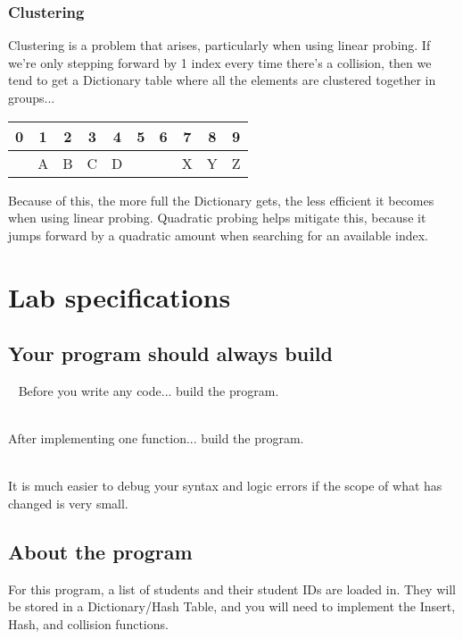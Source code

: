 \documentclass[a4paper,12pt,oneside]{book}
\begin{document}
\subsubsection{Clustering}

Clustering is a problem that arises, particularly when using linear probing.
If we're only stepping forward by 1 index every time there's a collision,
then we tend to get a Dictionary table where all the elements are clustered
together in groups...

\begin{center}
    \begin{tabular}{| c | c | c | c | c | c | c | c | c | c |}
        \hline
        0 & 1 & 2 & 3 & 4 & 5 & 6 & 7 & 8 & 9
        \\ \hline
        & A & B & C & D & & & X & Y & Z
        \\ \hline
    \end{tabular}
\end{center}

Because of this, the more full the Dictionary gets, the less efficient
it becomes when using linear probing. Quadratic probing helps mitigate this,
because it jumps forward by a quadratic amount when searching for an
available index.

\section{Lab specifications}

\subsection{Your program should always build}

\begin{error}{\ }
Before you write any code... build the program.

~\\
After implementing one function... build the program.

~\\
It is much easier to debug your syntax and logic errors if the scope
of what has changed is very small.
\end{error}

\subsection{About the program}

For this program, a list of students and their student IDs are
loaded in.
They will be stored in a Dictionary/Hash Table, and you will need to
implement the Insert, Hash, and collision functions.
\end{document}
